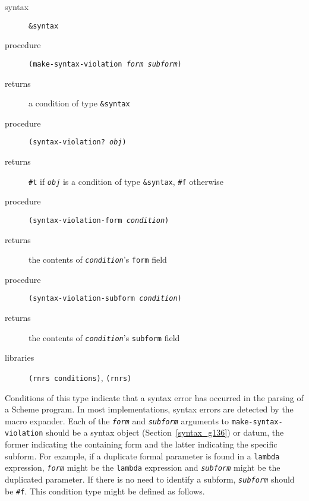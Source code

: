 \begin{description}

\label{exceptions_s30}\item[syntax] \texttt{\&{}syntax}



\item[procedure] \texttt{(make-syntax-violation \textit{form} \textit{subform})}



\item[returns] a condition of type \texttt{\&{}syntax}


\item[procedure] \texttt{(syntax-violation? \textit{obj})}



\item[returns] \texttt{\#{}t} if \texttt{\textit{obj}} is a condition of type \texttt{\&{}syntax}, \texttt{\#{}f} otherwise


\item[procedure] \texttt{(syntax-violation-form \textit{condition})}



\item[returns] the contents of \texttt{\textit{condition}}'s \texttt{form} field


\item[procedure] \texttt{(syntax-violation-subform \textit{condition})}



\item[returns] the contents of \texttt{\textit{condition}}'s \texttt{subform} field


\item[libraries] \texttt{(rnrs conditions)}, \texttt{(rnrs)}
\end{description}



Conditions of this type indicate that a syntax error has occurred in the parsing
of a Scheme program.
In most implementations, syntax errors are detected by the macro expander.
Each of the \texttt{\textit{form}} and \texttt{\textit{subform}} arguments to
\texttt{make-syntax-violation} should be a syntax object
(Section \ref{syntax_g136}) or datum, the former indicating the containing
form and the latter indicating the specific subform.
For example, if a duplicate formal parameter is found in a \texttt{lambda} expression,
\texttt{\textit{form}} might be the \texttt{lambda} expression and \texttt{\textit{subform}} might be
the duplicated parameter.
If there is no need to identify a subform, \texttt{\textit{subform}} should be \texttt{\#{}f}.
This condition type might be defined as follows.

